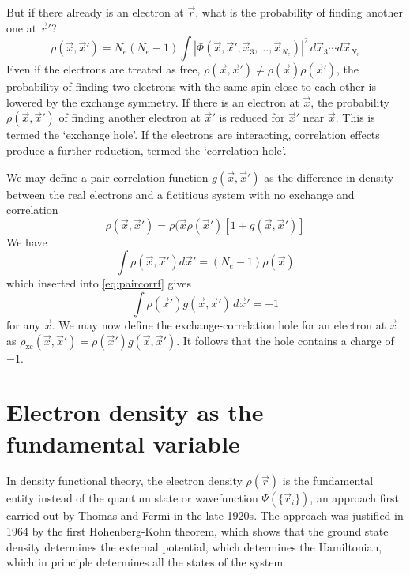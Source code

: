 \documentclass[11pt,bibliography=totoc,index=totoc]{scrbook}   %
\begin{document}
But if there already is an electron at $\vec{r}$, what is the probability of finding another one at $\vec{r}'$? 
\begin{equation}
  \rho(\vec{x},\vec{x}') = N_e(N_e-1)\int |\Phi(\vec{x},\vec{x}',\vec{x}_3,\ldots,\vec{x}_{N_e} )|^2
 \,d\vec{x}_3\cdots d\vec{x}_{N_e}
\end{equation}
Even if the electrons are treated as free, $\rho(\vec{x},\vec{x}')\neq\rho(\vec{x})\rho(\vec{x}')$, the probability of finding two electrons with the same spin close to each other is lowered by the exchange symmetry. If there is an electron at $\vec{x}$, the probability $\rho(\vec{x},\vec{x}')$ of finding another electron at $\vec{x}'$ is reduced for $\vec{x}'$ near $\vec{x}$. 
This is termed the `exchange hole'.
If the electrons are interacting, correlation effects produce a further reduction, termed the `correlation hole'.

We may define a pair correlation function $g(\vec{x},\vec{x}')$ as the difference in density between the real electrons and a fictitious system with no exchange and correlation
\begin{equation}
  \rho(\vec{x},\vec{x}') = \rho(\vec{x}\rho(\vec{x}')[1 + g(\vec{x},\vec{x}')]
  \label{eq:paircorrf}
\end{equation}
We have
\begin{equation}
  \int \rho(\vec{x},\vec{x}') d\vec{x}' = (N_e-1)\rho(\vec{x})
\end{equation}
which inserted into \eqref{eq:paircorrf} gives
\begin{equation}
  \int \rho(\vec{x}') g(\vec{x},\vec{x}')\, d\vec{x}' = -1
\end{equation}
for any $\vec{x}$. We may now define the exchange-correlation hole for an electron at $\vec{x}$ as $\rho_{\text{xc}}(\vec{x},\vec{x}') = \rho(\vec{x}')g(\vec{x},\vec{x}')$. It follows that the hole contains a charge of $-1$.


\section{Electron density as the fundamental variable}

In density functional theory, the electron density $\rho(\vec{r})$ is the
fundamental entity instead of the quantum state or wavefunction
$\Psi(\{\vec{r}_i\})$, an
approach first carried out by Thomas\cite{Thomas:1927} and 
Fermi\cite{Fermi:1928} in the late 1920s. The approach was
justified in 1964 by the first Hohenberg-Kohn theorem\cite{HohenbergKohn:1964}, 
which shows that the ground state density determines the external potential,
which determines the Hamiltonian, which in principle determines all the 
states of the system.
\end{document}
